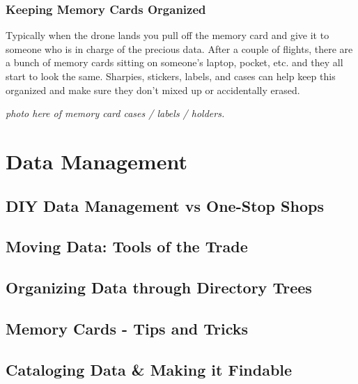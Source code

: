 \documentclass[
]{book}
\begin{document}
\hypertarget{keeping-memory-cards-organized}{%
\subsection{Keeping Memory Cards Organized}\label{keeping-memory-cards-organized}}

Typically when the drone lands you pull off the memory card and give it to someone who is in charge of the precious data. After a couple of flights, there are a bunch of memory cards sitting on someone's laptop, pocket, etc. and they all start to look the same. Sharpies, stickers, labels, and cases can help keep this organized and make sure they don't mixed up or accidentally erased.

\emph{photo here of memory card cases / labels / holders. }

\hypertarget{data-management}{%
\chapter{Data Management}\label{data-management}}

\hypertarget{diy-data-management-vs-one-stop-shops}{%
\section{DIY Data Management vs One-Stop Shops}\label{diy-data-management-vs-one-stop-shops}}

\hypertarget{moving-data-tools-of-the-trade}{%
\section{Moving Data: Tools of the Trade}\label{moving-data-tools-of-the-trade}}

\hypertarget{organizing-data-through-directory-trees}{%
\section{Organizing Data through Directory Trees}\label{organizing-data-through-directory-trees}}

\hypertarget{memory-cards---tips-and-tricks}{%
\section{Memory Cards - Tips and Tricks}\label{memory-cards---tips-and-tricks}}

\hypertarget{cataloging-data-making-it-findable}{%
\section{Cataloging Data \& Making it Findable}\label{cataloging-data-making-it-findable}}
\end{document}
